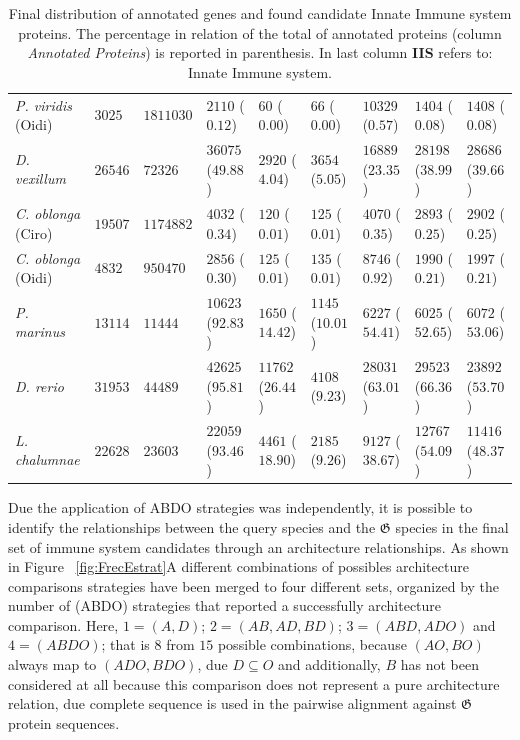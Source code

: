 \documentclass[11pt]{article}
\begin{document}
\begin{table}
\begin{tabular}{p{3.2cm}p{2cm}p{2cm}p{2cm}p{2cm}p{2cm}p{2.1cm}p{2.7cm}p{2.6cm}}
\textsl{P. viridis} (Oidi)&$3025$&$1811030$&$2110$ ($0.12$)&$60$ ($0.00$)&$66$ ($0.00$)&$10329$ ($0.57$)&$1404$ ($0.08$)&$1408$ ($0.08$)\\
\textsl{D. vexillum}&$26546$&$72326$&$36075$ ($49.88$)&$2920$ ($4.04$)&$3654$ ($5.05$)&$16889$ ($23.35$)&$28198$ ($38.99$)&$28686$ ($39.66$)\\
\textsl{C. oblonga} (Ciro)&$19507$&$1174882$&$4032$ ($0.34$)&$120$ ($0.01$)&$125$ ($0.01$)&$4070$ ($0.35$)&$2893$ ($0.25$)&$2902$ ($0.25$)\\
\textsl{C. oblonga} (Oidi)&$4832$&$950470$&$2856$ ($0.30$)&$125$ ($0.01$)&$135$ ($0.01$)&$8746$ ($0.92$)&$1990$ ($0.21$)&$1997$ ($0.21$)\\
\midrule
\textsl{P. marinus}&$13114$&$11444$&$10623$ ($92.83$)&$1650$ ($14.42$)&$1145$ ($10.01$)&$6227$ ($54.41$)&$6025$ ($52.65$)&$6072$ ($53.06$)\\
\textsl{D. rerio}&$31953$&$44489$&$42625$ ($95.81$)&$11762$ ($26.44$)&$4108$ ($9.23$)&$28031$ ($63.01$)&$29523$ ($66.36$)&$23892$ ($53.70$)\\
\textsl{L. chalumnae}&$22628$&$23603$&$22059$ ($93.46$)&$4461$ ($18.90$)&$2185$ ($9.26$)&$9127$ ($38.67$)&$12767$ ($54.09$)&$11416$ ($48.37$)\\
\bottomrule
\end{tabular}
\caption{Final distribution of annotated genes and found candidate Innate
Immune system proteins. The percentage in relation of the total of annotated
proteins (column \textit{Annotated Proteins}) is reported in parenthesis. In
last column \textbf{IIS} refers to: Innate Immune system.}
\label{table:distribution_prot}
\end{table}

Due the application of ABDO strategies was independently, it is possible to 
identify the relationships between the query species and the 
$\boldsymbol{\mathfrak{G}}$ species in the final set of immune system 
candidates through an architecture relationships. As shown in Figure 
~\ref{fig:FrecEstrat}A different combinations of possibles architecture 
comparisons strategies have been merged to four different sets, organized by the 
number of (ABDO) strategies that reported a successfully architecture 
comparison. Here, $1 = (A, D)$; $2 = (AB, AD, BD)$; $3 = (ABD, ADO)$ 
and $4 = (ABDO)$; that is $8$ from $15$ possible combinations, because $ (AO, 
BO)$ always map to $ (ADO, BDO)$, due $D \subseteq O$ and additionally, $B$ has 
not been considered at all because this comparison does not represent a pure 
architecture relation, due complete sequence is used in the pairwise alignment 
against $\boldsymbol{\mathfrak{G}}$ protein sequences. 
\end{document}
